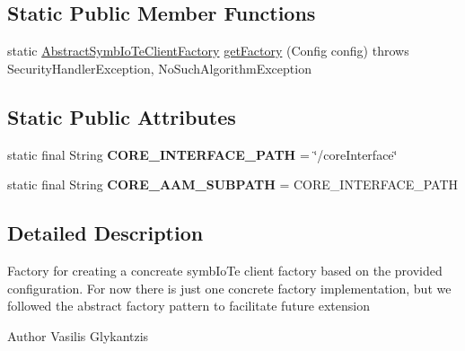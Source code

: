 \subsection*{Static Public Member Functions}
\begin{DoxyCompactItemize}
\item 
static \hyperlink{classeu_1_1h2020_1_1symbiote_1_1client_1_1AbstractSymbIoTeClientFactory}{Abstract\+Symb\+Io\+Te\+Client\+Factory} \hyperlink{classeu_1_1h2020_1_1symbiote_1_1client_1_1AbstractSymbIoTeClientFactory_aa2bad8b989cec6b2b2d6f8c97432c116}{get\+Factory} (Config config)  throws Security\+Handler\+Exception, No\+Such\+Algorithm\+Exception 
\end{DoxyCompactItemize}
\subsection*{Static Public Attributes}
\begin{DoxyCompactItemize}
\item 
\mbox{\label{classeu_1_1h2020_1_1symbiote_1_1client_1_1AbstractSymbIoTeClientFactory_a38b5ace3a73f7def0d05e1e8f43e2ced}} 
static final String {\bfseries C\+O\+R\+E\+\_\+\+I\+N\+T\+E\+R\+F\+A\+C\+E\+\_\+\+P\+A\+TH} = \char`\"{}/core\+Interface\char`\"{}
\item 
\mbox{\label{classeu_1_1h2020_1_1symbiote_1_1client_1_1AbstractSymbIoTeClientFactory_a0e4ba4c400c472d84d45fe94ae13b0c1}} 
static final String {\bfseries C\+O\+R\+E\+\_\+\+A\+A\+M\+\_\+\+S\+U\+B\+P\+A\+TH} = C\+O\+R\+E\+\_\+\+I\+N\+T\+E\+R\+F\+A\+C\+E\+\_\+\+P\+A\+TH
\end{DoxyCompactItemize}


\subsection{Detailed Description}
Factory for creating a concreate symb\+Io\+Te client factory based on the provided configuration. For now there is just one concrete factory implementation, but we followed the abstract factory pattern to facilitate future extension

\begin{DoxyAuthor}{Author}
Vasilis Glykantzis 
\end{DoxyAuthor}



